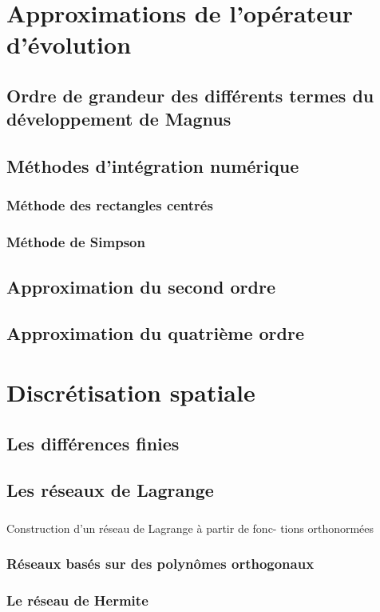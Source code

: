 \documentclass[a4paper, 12pt]{report}
\begin{document}
\chapter{Approximations de l’opérateur
d’évolution}
\section{Ordre de grandeur des différents termes du
développement de Magnus}
\section{Méthodes d’intégration numérique}
\subsection{Méthode des rectangles centrés}
\subsection{Méthode de Simpson}
\section{Approximation du second ordre}
\section{Approximation du quatrième ordre}
\chapter{Discrétisation spatiale}
\section{Les différences finies}
\section{Les réseaux de Lagrange}
\subsection{}Construction d’un réseau de Lagrange à partir de fonc-
tions orthonormées
\subsection{Réseaux basés sur des polynômes orthogonaux}
\subsection{Le réseau de Hermite}
\end{document}
